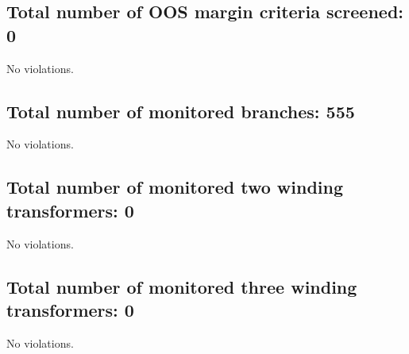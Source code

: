 \documentclass{article}%
\begin{document}
%
\subsection*{Total number of OOS margin criteria screened: 0}%
\label{subsec:TotalnumberofOOSmargincriteriascreened0}%
No violations.

%
\subsection*{Total number of monitored branches: 555}%
\label{subsec:Totalnumberofmonitoredbranches555}%
No violations.

%
\subsection*{Total number of monitored two winding transformers: 0}%
\label{subsec:Totalnumberofmonitoredtwowindingtransformers0}%
No violations.

%
\subsection*{Total number of monitored three winding transformers: 0}%
\label{subsec:Totalnumberofmonitoredthreewindingtransformers0}%
No violations.

%
\end{document}
